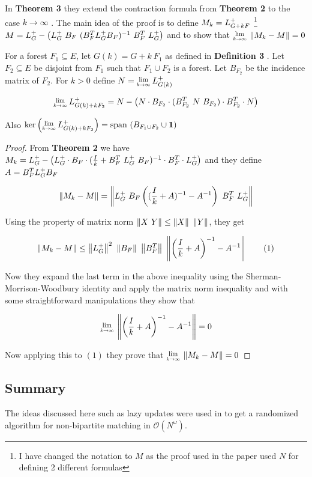 In \textbf{Theorem 3} they extend the contraction formula from \textbf{Theorem 2} to the case $k \rightarrow \infty$ . The main idea of the proof is to define $M_k = \laplacian[G + kF]$ \footnote{I have changed the notation to $M$ as the proof used in the paper used $N$ for defining 2 different formulas} \\ $M = \laplacian - \left(\laplacian \ B_F \ (B_F^T \laplacian B_F)^{-1} \ B_F^T \  \laplacian\right)$ and to show that $\Lim{k \to \infty} \norm{M_k - M} = 0$

\begin{HXt}
 For a forest $F_1 \subseteq E$, let $G(k) = G + k \ F_1$ as defined in \textbf{Definition 3} . Let $F_2 \subseteq E$ be disjoint from $F_1$ such that $F_1 \cup F_2$ is a forest. Let $B_{F_2}$ be the incidence matrix of $F_2$. For $k > 0$ define $N = \Lim{k \to \infty} \laplacian[G(k)]$

 $$ \Lim{k \to \infty} \laplacian[G(k) + kF_2] = N - \left( N \cdot B_{F_2} \cdot (B_{F_2}^T \ N \ B_{F_2}) \cdot B_{F_2}^T \cdot N \right)$$ 

 Also $\text{ker} \left( \Lim{k \to \infty} \laplacian[G(k) + kF_2] \right) = \text{span }(B_{F_1 \cup F_2} \cup \textbf{1})$
 \end{HXt}



\begin{proof}
 From \textbf{Theorem 2} we have $M_k = \laplacian - \left(\laplacian \cdot B_F \cdot (\frac{I}{k} + B_F^T \ \laplacian \ B_F)^{-1} \cdot B_F^T \cdot \laplacian \right)$ and they define $A = B_F^T \laplacian B_F$
 
 $$ \norm{M_k - M} = \norm{\laplacian \ B_F \left( (\frac{I}{k} + A)^{-1} - A^{-1} \right) \ B_F^T \ \laplacian}$$
 
 Using the property of matrix norm $\norm{X \ Y} \leq \norm{X} \ \norm{Y}$, they get 
 
 $$ \norm{M_k - M} \leq \norm{\laplacian}^2 \ \norm{B_F} \ \norm{B_F^T} \ \norm{\left( \frac{I}{k} + A \right)^{-1} - A^{-1}} \qquad (1)$$
 
 Now they expand the last term in the above inequality using the Sherman-Morrison-Woodbury identity and apply the matrix norm inequality and with some straightforward manipulations they show that 
 
 $$\Lim{k \to \infty} \norm{\left( \frac{I}{k} + A \right)^{-1} - A^{-1} } = 0$$
 
Now applying this to $(1)$ they prove that $\Lim{k \to \infty} \norm{M_k - M} = 0$
\end{proof}



\subsection{Summary}

The ideas discussed here such as lazy updates were used in \citet{10.1137/070684008} to get a randomized algorithm for non-bipartite matching in $\mathcal{O}(N^\omega)$. 






